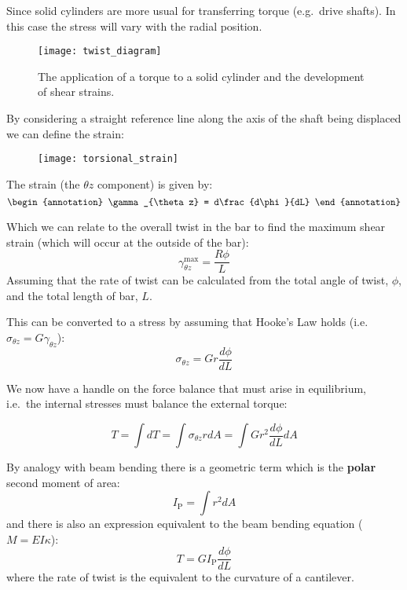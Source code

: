 Since solid cylinders are more usual for transferring torque (e.g.\ drive shafts). In this case the stress will vary with the radial position.

\FloatBarrier
\begin{figure}[h!]
\centering
\texttt{[image: twist\_diagram]}
\caption{The application of a torque to a solid cylinder and the development of shear strains.}
\end{figure}
\FloatBarrier


By considering a straight reference line along the axis of the shaft being displaced we can define the strain:

\FloatBarrier
\begin{figure}[h!]
\centering
\texttt{[image: torsional\_strain]}
\end{figure}
\FloatBarrier

The strain (the $\theta z$ component) is given by:
\begin{equation}
\begin{annotation}
\gamma_{\theta z} = d\frac{d\phi}{dL}
\end{annotation}
\end{equation}

Which we can relate to the overall twist in the bar to find the maximum shear strain (which will occur at the outside of the bar):
\begin{equation}
\gamma_{\theta z}^{\text{max}} = \frac{R\phi}{L}
\end{equation}
Assuming that the rate of twist can be calculated from the total angle of twist, $\phi$, and the total length of bar, $L$.

This can be converted to a stress by assuming that Hooke's Law holds (i.e.\ $\sigma_{\theta z} = G \gamma_{\theta z}$):
\begin{equation}
\sigma_{\theta z} = G r \frac{d\phi}{dL}
\end{equation}


We now have a handle on the force balance that must arise in equilibrium, i.e.\ the internal stresses must balance the external torque:

\begin{equation}
T = \int dT = \int \sigma_{\theta z} r dA = \int Gr^2 \frac{d\phi}{dL}dA
\end{equation}

By analogy with beam bending there is a geometric term which is the {\bf polar} second moment of area:
\begin{equation}
I_{\text{P}} = \int r^2 dA
\end{equation}
and there is also an expression equivalent to the beam bending equation ($M=EI\kappa$):
\begin{equation}
T = G I_{\text{P}} \frac{d\phi}{dL}
\end{equation}
where the rate of twist is the equivalent to the curvature of a cantilever.

